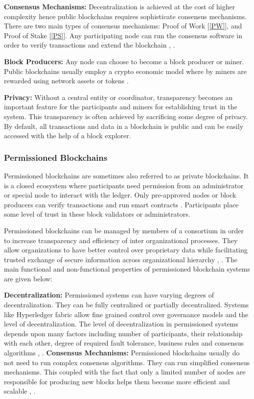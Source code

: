\textbf{Consensus Mechanisms:}
Decentralization is achieved at the cost of higher complexity hence public blockchains requires sophisticate consensus mechanisms. There are two main types of consensus mechanisms: Proof of Work [\ref{PW}], and Proof of Stake [\ref{PS}]. Any participating node can run the consensus software in order to verify transactions and extend the blockchain \cite{arXiv:1806.03693}, \cite{misc:017}.

\textbf{Block Producers:}
Any node can choose to become a block producer or miner. Public blockchains usually employ a crypto economic model where by miners are rewarded using network assets or tokens \cite{paper:001}.

\textbf{Privacy:}
Without a central entity or coordinator, transparency becomes an important feature for the participants and miners for establishing trust in the system. This transparency is often achieved by sacrificing some degree of privacy. By default, all transactions and data in a blockchain is public and can be easily accessed with the help of a block explorer.  
\vspace{1cm}
\subsubsection{Permissioned Blockchains}
Permissioned blockchains are sometimes also referred to as private blockchains. It is a closed ecosystem where participants need permission from an administrator or special node to interact with the ledger. Only pre-approved nodes or block producers can verify transactions and run smart contracts \cite{arXiv:1806.03693}. Participants place some level of trust in these block validators or administrators. 

Permissioned blockchains can be managed by members of a consortium in order to increase transparency and efficiency of inter organizational processes. They allow organizations to have better control over proprietary data while facilitating trusted exchange of secure information across organizational hierarchy \cite{arXiv:1806.03693}, \cite{misc:017}. The main functional and non-functional properties of permissioned blockchain systems are given below: 

\textbf{Decentralization:}
Permissioned systems can have varying degrees of decentralization. They can be fully centralized or partially decentralized. Systems like Hyperledger fabric allow fine grained control over governance models and the level of decentralization. The level of decentralization in permissioned systems depends upon many factors including number of participants, their relationship with each other, degree of required fault tolerance, business rules and consensus algorithms \cite{arXiv:1806.03693}, \cite{misc:017}.
\clearpage
\textbf{Consensus Mechanisms:}
Permissioned blockchains usually do not need to run complex consensus algorithms. They can run simplified consensus mechanisms. This coupled with the fact that only a limited number of nodes are responsible for producing new blocks helps them become more efficient and scalable \cite{arXiv:1806.03693}, \cite{misc:017}. 

